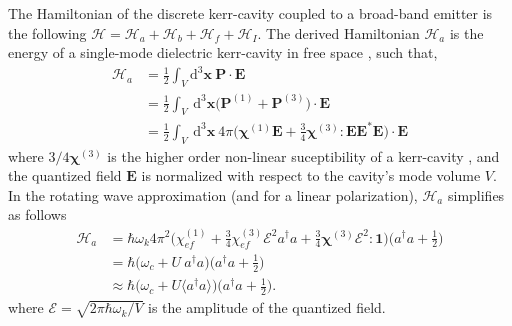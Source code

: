 \documentclass[12pt]{article}
\begin{document}
The Hamiltonian of the discrete kerr-cavity coupled to a broad-band emitter is
the following $\mathcal{H} = \mathcal{H}_{a} + \mathcal{H}_{b} + 
\mathcal{H}_{f} + \mathcal{H}_{I}$. The derived Hamiltonian $\mathcal{H}_{a}$ 
is the energy of a single-mode dielectric kerr-cavity in free space 
\cite{jackson1999classical}, such that,
\begin{equation}
\begin{split}
\mathcal{H}_{a} &= \frac{1}{2} 
    \int_{V} \mathrm{d}^{3}\mathbf{x} \: \mathbf{P} \cdot \mathbf{E}
\\
&= \frac{1}{2} 
    \int_{V} \: \mathrm{d}^{3}\mathbf{x}
    \Big( \mathbf{P}^{(1)} + \mathbf{P}^{(3)} \Big)
    \cdot \mathbf{E}
\\
&= \frac{1}{2} 
    \int_{V} \: \mathrm{d}^{3}\mathbf{x} \: 4\pi 
    \Big( \bm\chi^{(1)} \mathbf{E}  + 
    \frac{3}{4}\bm\chi^{(3)}:\mathbf{E}\mathbf{E}^{*} \mathbf{E} \Big)
    \cdot \mathbf{E}
\end{split}
\end{equation}
where $3/4\mathbf{\chi}^{(3)}$ is the higher order non-linear suceptibility of
a kerr-cavity \cite{butcher1990elements}, and the quantized field $\mathbf{E}$
is normalized with respect to the cavity's mode volume $V$. In the rotating
wave approximation (and for a linear polarization), $\mathcal{H}_{a}$
simplifies as follows
\begin{equation}
\begin{split}
\mathcal{H}_{a} &= \hbar\omega_k 4\pi^{2} \Big(
    \chi^{(1)}_{ef} +
    \frac{3}{4} \chi^{(3)}_{ef} \mathcal{E}^2
    a^{\dagger}a + \frac{3}{4}\bm\chi^{(3)} \mathcal{E}^2 : \mathbf{1} \Big)
    \Big( a^{\dagger}a + \frac{1}{2} \Big)
\\
&= \hbar \Big( \omega_c + U\:a^{\dagger}a \Big)
    \Big( a^{\dagger}a + \frac{1}{2} \Big)
\\  
&\approx \hbar \Big( \omega_c + U \langle a^{\dagger}a \rangle \Big)
    \Big( a^{\dagger}a + \frac{1}{2} \Big).
\end{split}
\end{equation}
where $\mathcal{E} = \sqrt{2\pi \hbar \omega_k / V }$ is the amplitude of the
quantized field.
\end{document}
